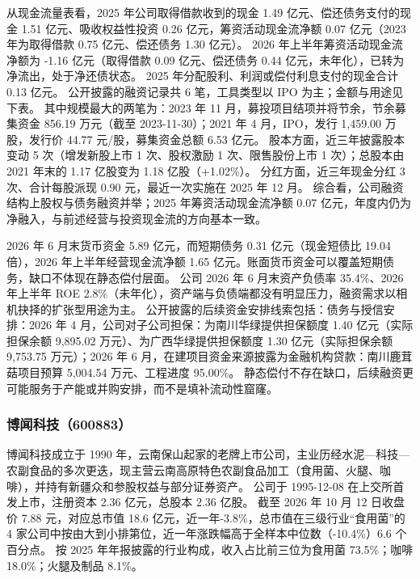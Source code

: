  从现金流量表看，2025 年公司取得借款收到的现金 1.49 亿元、偿还债务支付的现金 1.51 亿元、吸收权益性投资 0.26 亿元，筹资活动现金流净额 0.07 亿元（2023 年为取得借款 0.75 亿元、偿还债务 1.30 亿元）。 2026 年上半年筹资活动现金流净额为 -1.16 亿元（取得借款 0.09 亿元、偿还债务 0.44 亿元，未年化），已转为净流出，处于净还债状态。 2025 年分配股利、利润或偿付利息支付的现金合计 0.13 亿元。 公开披露的融资记录共 6 笔，工具类型以 IPO 为主；金额与用途见下表。 其中规模最大的两笔为：2023 年 11 月，募投项目结项并将节余，节余募集资金 856.19 万元（截至 2023-11-30）；2021 年 4 月，IPO，发行 1,459.00 万股，发行价 44.77 元/股，募集资金总额 6.53 亿元。 股本方面，近三年披露股本变动 5 次（增发新股上市 1 次、股权激励 1 次、限售股份上市 1 次）；总股本由 2021 年末的 1.17 亿股变为 1.18 亿股（+1.02\%）。 分红方面，近三年现金分红 3 次、合计每股派现 0.90 元，最近一次实施在 2025 年 12 月。 综合看，公司融资结构上股权与债务融资并举；2025 年筹资活动现金流净额 0.07 亿元，年度内仍为净融入，与前述经营与投资现金流的方向基本一致。

 2026 年 6 月末货币资金 5.89 亿元，而短期债务 0.31 亿元（现金短债比 19.04 倍），2026 年上半年经营现金流净额 1.65 亿元。账面货币资金可以覆盖短期债务，缺口不体现在静态偿付层面。 公司 2026 年 6 月末资产负债率 35.4\%、2026 年上半年 ROE 2.8\%（未年化），资产端与负债端都没有明显压力，融资需求以相机抉择的扩张型用途为主。 公开披露的后续资金安排线索包括：债务与授信安排：2026 年 4 月，公司对子公司担保：为南川华绿提供担保额度 1.40 亿元（实际担保余额 9,895.02 万元）、为广西华绿提供担保额度 1.30 亿元（实际担保余额 9,753.75 万元）；2026 年 6 月，在建项目资金来源披露为金融机构贷款：南川鹿茸菇项目预算 5,004.54 万元、工程进度 95.00\%。 静态偿付不存在缺口，后续融资更可能服务于产能或并购安排，而不是填补流动性窟窿。




\subsubsection{博闻科技（600883）}
\label{co:600883}

 博闻科技成立于 1990 年，云南保山起家的老牌上市公司，主业历经水泥—科技—农副食品的多次更迭，现主营云南高原特色农副食品加工（食用菌、火腿、咖啡），并持有新疆众和参股权益与部分证券资产。 公司于 1995-12-08 在上交所首发上市，注册资本 2.36 亿元，总股本 2.36 亿股。 截至 2026 年 10 月 12 日收盘价 7.88 元，对应总市值 18.6 亿元，近一年-3.8\%，总市值在三级行业“食用菌”的 4 家公司中按由大到小排第位，近一年涨跌幅高于全样本中位数（-10.4\%）6.6 个百分点。 按 2025 年年报披露的行业构成，收入占比前三位为食用菌 73.5\%；咖啡 18.0\%；火腿及制品 8.1\%。

